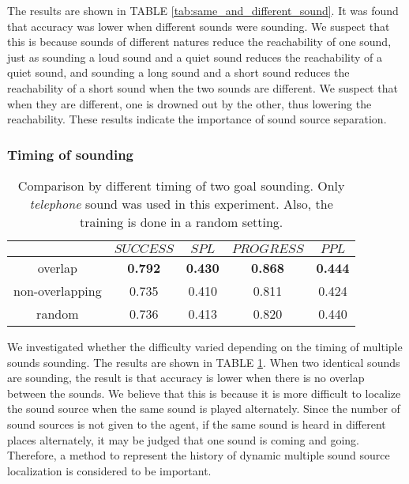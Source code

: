 The results are shown in TABLE \ref{tab:same_and_different_sound}.
It was found that accuracy was lower when different sounds were sounding.
We suspect that this is because sounds of different natures reduce the reachability of one sound, just as sounding a loud sound and a quiet sound reduces the reachability of a quiet sound, and sounding a long sound and a short sound reduces the reachability of a short sound when the two sounds are different.
We suspect that when they are different, one is drowned out by the other, thus lowering the reachability.
These results indicate the importance of sound source separation.





\subsubsection{Timing of sounding}


\begin{table}[tb]
    \centering
    \caption{
        Comparison by different timing of two goal sounding.
        Only \textit{telephone} sound was used in this experiment.
        Also, the training is done in a random setting.
    }
    \label{tab:sound_timing}
    \begin{tabular}{@{}ccccc@{}}
    \toprule
        & $SUCCESS$ & $SPL$ & $PROGRESS$ & $PPL$ \\ \midrule
        overlap & \textbf{0.792} & \textbf{0.430} & \textbf{0.868} & \textbf{0.444} \\
        non-overlapping & 0.735 & 0.410 & 0.811 & 0.424 \\
        random & 0.736 & 0.413 & 0.820 & 0.440 \\ \bottomrule
    \end{tabular}
\end{table}

We investigated whether the difficulty varied depending on the timing of multiple sounds sounding.
The results are shown in TABLE \ref{tab:sound_timing}.
When two identical sounds are sounding, the result is that accuracy is lower when there is no overlap between the sounds.
We believe that this is because it is more difficult to localize the sound source when the same sound is played alternately.
Since the number of sound sources is not given to the agent, if the same sound is heard in different places alternately, it may be judged that one sound is coming and going.
Therefore, a method to represent the history of dynamic multiple sound source localization is considered to be important.




